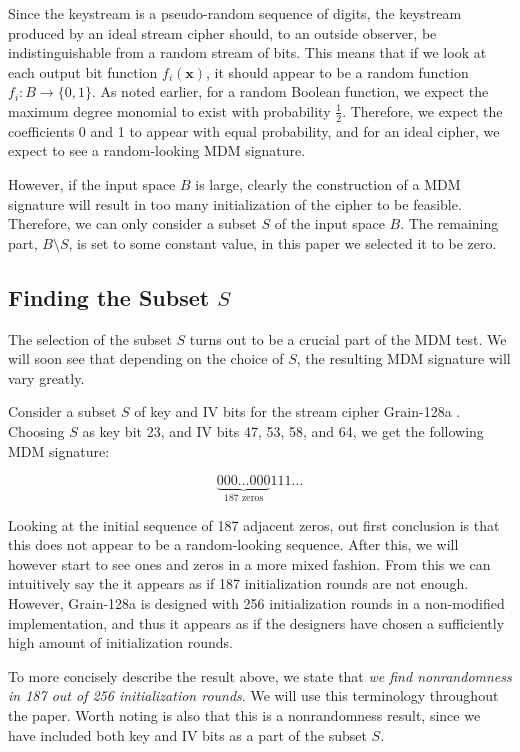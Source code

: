 {Since the keystream is a pseudo-random sequence of digits, the keystream produced by an ideal stream cipher should, to an outside observer, be indistinguishable from a random stream of bits. This means that if we look at each output bit function $f_i(\bm{x})$, it should appear to be a random function $f_i: B \rightarrow \{0,1\}$. As noted earlier, for a random Boolean function, we expect the maximum degree monomial to exist with probability $\frac{1}{2}$. Therefore, we expect the coefficients 0 and 1 to appear with equal probability, and for an ideal cipher, we expect to see a random-looking MDM signature.

However, if the input space $B$ is large, clearly the construction of a MDM signature will result in too many initialization of the cipher to be feasible. Therefore, we can only consider a subset $S$ of the input space $B$. The remaining part, $B \setminus S$, is set to some constant value, in this paper we selected it to be zero.

\subsection{Finding the Subset $S$}
The selection of the subset $S$ turns out to be a crucial part of the MDM test. We will soon see that depending on the choice of $S$, the resulting MDM signature will vary greatly.

Consider a subset $S$ of key and IV bits for the stream cipher Grain-128a \cite{agren:2011}. Choosing $S$ as key bit 23, and IV bits 47, 53, 58, and 64, we get the following MDM signature:

\[
\underbrace{000\ldots 000}_{\text{187 zeros}}111\ldots
\]

Looking at the initial sequence of 187 adjacent zeros, out first conclusion is that this does not appear to be a random-looking sequence. After this, we will however start to see ones and zeros in a more mixed fashion. From this we can intuitively say the it appears as if 187 initialization rounds are not enough. However, Grain-128a is designed with 256 initialization rounds in a non-modified implementation, and thus it appears as if the designers have chosen a sufficiently high amount of initialization rounds.

To more concisely describe the result above, we state that \emph{we find nonrandomness in 187 out of 256 initialization rounds}. We will use this terminology throughout the paper. Worth noting is also that this is a nonrandomness result, since we have included both key and IV bits as a part of the subset $S$.

}
